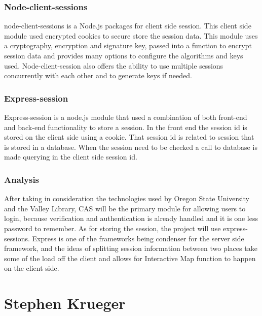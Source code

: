 \documentclass[letterpaper,10pt,titlepage, onecolumn, compsoc]{IEEEtran}
\begin{document}
\subsubsection{Node-client-sessions}
node-client-sessions is a Node.js packages for client side session. This client side module used encrypted cookies to secure store the session data. This module uses a cryptography, encryption and signature key, passed into a function to encrypt session data and provides many options to configure the algorithms and keys used. Node-client-session also offers the ability to use multiple sessions concurrently with each other and to generate keys if needed. \cite{mozilla2016}

\subsubsection{Express-session}
Express-session is a node.js module that used a combination of both front-end and back-end functionality to store a session. In the front end the session id is stored on the client side using a cookie. That session id is related to session that is stored in a database. When the session need to be checked a call to database is made querying in the client side session id. \cite{expressjs2016}

\subsubsection{Analysis}
After taking in consideration the technologies used by Oregon State University and the Valley Library, CAS will be the primary module for allowing users to login, because verification and authentication is already handled and it is one less password to remember. As for storing the session, the project will use express-sessions. Express is one of the frameworks being condenser for the server side framework, and the ideas of splitting session information between two places take some of the load off the client and allows for Interactive Map function to happen on the client side. 


\section{Stephen Krueger}

\end{document}
